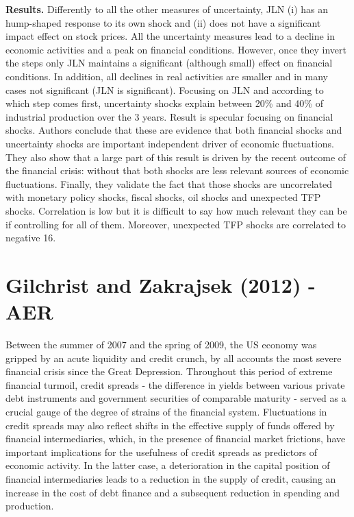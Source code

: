 \documentclass{article}
\begin{document}
{\textbf{Results.} Differently to all the other measures of uncertainty, JLN (i) has an hump-shaped response to its own shock and (ii) does not have a significant impact effect on stock prices. All the uncertainty measures lead to a decline in economic activities and a peak on financial conditions. However, once they invert the steps only JLN maintains a significant (although small) effect on financial conditions. In addition, all declines in real activities are smaller and in many cases not significant (JLN is significant). Focusing on JLN and according to which step comes first, uncertainty shocks explain between 20\% and 40\% of industrial production over the 3 years. Result is specular focusing on financial shocks. Authors conclude that these are evidence that both financial shocks and uncertainty shocks are important independent driver of economic fluctuations. They also show that a large part of this result is driven by the recent outcome of the financial crisis: without that both shocks are less relevant sources of economic fluctuations. Finally, they validate the fact that those shocks are uncorrelated with monetary policy shocks, fiscal shocks, oil shocks and unexpected TFP shocks. Correlation is low but it is difficult to say how much relevant they can be if controlling for all of them. Moreover, unexpected TFP shocks are correlated to negative 16.   



\section{Gilchrist and Zakrajsek (2012) - AER}

Between the summer of 2007 and the spring of 2009, the US economy was gripped by an acute liquidity and credit crunch, by all accounts the most severe financial crisis since the Great Depression. Throughout this period of extreme financial turmoil, credit spreads - the difference in yields between various private debt instruments and government securities of comparable maturity - served as a crucial gauge of the degree of strains of the financial system. Fluctuations in credit spreads may also reflect shifts in the effective supply of funds offered by financial intermediaries, which, in the presence of financial market frictions, have important implications for the usefulness of credit spreads as predictors of economic activity. In the latter case, a deterioration in the capital position of financial intermediaries leads to a reduction in the supply of credit, causing an increase in the cost of debt finance and a subsequent reduction in spending and production. 

}
\end{document}
